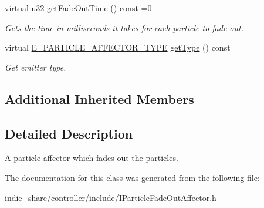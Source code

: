 \begin{DoxyCompactItemize}
virtual \hyperlink{namespaceirr_a0416a53257075833e7002efd0a18e804}{u32} \hyperlink{classirr_1_1scene_1_1IParticleFadeOutAffector_a4c4195b7878fd93526506e1c592bdbec}{get\+Fade\+Out\+Time} () const =0
\begin{DoxyCompactList}\small\item\em Gets the time in milliseconds it takes for each particle to fade out. \end{DoxyCompactList}\item 
\mbox{\label{classirr_1_1scene_1_1IParticleFadeOutAffector_aaf584388aa7065bbfdb571253ba34b61}} 
virtual \hyperlink{namespaceirr_1_1scene_a34c0f9475cfcbda8b50ad816a046010b}{E\+\_\+\+P\+A\+R\+T\+I\+C\+L\+E\+\_\+\+A\+F\+F\+E\+C\+T\+O\+R\+\_\+\+T\+Y\+PE} \hyperlink{classirr_1_1scene_1_1IParticleFadeOutAffector_aaf584388aa7065bbfdb571253ba34b61}{get\+Type} () const
\begin{DoxyCompactList}\small\item\em Get emitter type. \end{DoxyCompactList}\end{DoxyCompactItemize}
\subsection*{Additional Inherited Members}


\subsection{Detailed Description}
A particle affector which fades out the particles. 

The documentation for this class was generated from the following file\+:\begin{DoxyCompactItemize}
\item 
indie\+\_\+share/controller/include/I\+Particle\+Fade\+Out\+Affector.\+h\end{DoxyCompactItemize}
